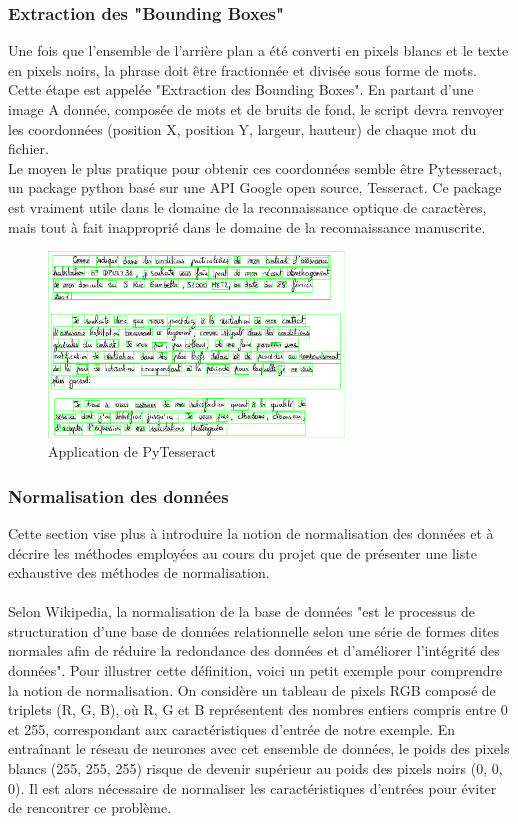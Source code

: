 \documentclass[oneside,a4paper,13pt]{article}
\begin{document}
\subsubsection{Extraction des "Bounding Boxes"}
Une fois que l'ensemble de l'arrière plan a été converti en pixels blancs et le texte en pixels noirs, la phrase doit être fractionnée et divisée sous forme de mots. Cette étape est appelée "Extraction des Bounding Boxes". 
En partant d'une image A donnée, composée de mots et de bruits de fond, le script devra renvoyer les coordonnées (position X, position Y, largeur, hauteur) de chaque mot du fichier. \\
Le moyen le plus pratique pour obtenir ces coordonnées semble être Pytesseract, un package python basé sur une API Google open source, Tesseract. Ce package est vraiment utile dans le domaine de la reconnaissance optique de caractères, mais tout à fait inapproprié dans le domaine de la reconnaissance manuscrite.
\begin{figure}[H]
\centering
\includegraphics[width=0.7\textwidth]{Images/copy.png} 
\caption{Application de PyTesseract}
\end{figure}
\subsubsection{Normalisation des données}
Cette section vise plus à introduire la notion de normalisation des données et à décrire les méthodes employées au cours du projet que de présenter une liste exhaustive des méthodes de normalisation. \\ \\
Selon Wikipedia, la normalisation de la base de données "est le processus de structuration d'une base de données relationnelle selon une série de formes dites normales afin de réduire la redondance des données et d'améliorer l'intégrité des données". Pour illustrer cette définition, voici un petit exemple pour comprendre la notion de normalisation.
On considère un tableau de pixels RGB composé de triplets (R, G, B), où R, G et B représentent des nombres entiers compris entre 0 et 255, correspondant aux caractéristiques d'entrée de notre exemple. En entraînant le réseau de neurones avec cet ensemble de données, le poids des pixels blancs (255, 255, 255) risque de devenir supérieur au poids des pixels noirs (0, 0, 0). Il est alors nécessaire de normaliser les caractéristiques d'entrées pour éviter de rencontrer ce problème. \\ \\
\end{document}

